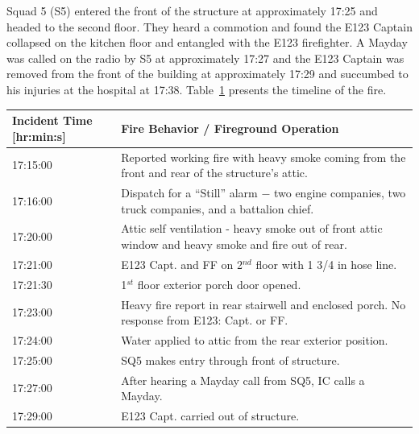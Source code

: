 \documentclass[11pt,oneside]{book}
\begin{document}
Squad 5 (S5) entered the front of the structure at approximately 17:25 and headed to the second floor. They heard a commotion and found the E123 Captain collapsed on the kitchen floor and entangled with the E123 firefighter. A Mayday was called on the radio by S5 at approximately  17:27 and the E123 Captain was removed from the front of the building at approximately 17:29 and succumbed to his injuries at the hospital at 17:38. Table~\ref{tab:fire_info} presents the timeline of the fire.

\begin{table}
\centering
{}\label{tab:fire_info}
\begin{tabular}{l l}
\toprule[1.5pt]
Incident Time [hr:min:s] & Fire Behavior / Fireground Operation  \\
\midrule
\multirow{2}{*}{17:15:00} & \multirow{2}{*}{\parbox{10cm} {Reported working fire with heavy smoke coming from the front and rear of the structure's attic.}} \\ 
         & \\[.25cm] %
\multirow{2}{*}{17:16:00}    &  \multirow{2}{*}{\parbox{10cm} {Dispatch for a ``Still'' alarm $-$ two engine companies, two truck companies, and a battalion chief.}} \\
         & \\[.25cm]
\multirow{2}{*}{17:20:00}    & \multirow{2}{*}{\parbox{10cm} {Attic self ventilation - heavy smoke out of front attic window and heavy smoke and fire out of rear.}} \\
         & \\[.25cm] 
17:21:00 & E123 Capt. and FF on 2$^{nd}$ floor with 1 3/4 in hose line. \\[.25cm]
17:21:30 & 1$^{st}$ floor exterior porch door opened. \\[.25cm]
\multirow{2}{*}{17:23:00}    & \multirow{2}{*}{\parbox{10cm} {Heavy fire report in rear stairwell and enclosed porch. No response from E123: Capt. or FF.}} \\
         & \\[.25cm]
17:24:00    & Water applied to attic from the rear exterior position. \\[.25cm]
17:25:00    & SQ5 makes entry through front of structure. \\[.25cm]
17:27:00    & After hearing a Mayday call from SQ5, IC calls a Mayday. \\[.25cm]
17:29:00    & E123 Capt. carried out of structure. \\
\bottomrule[1.25pt]
\end{tabular}\par
\end{table}
 
\end{document}
